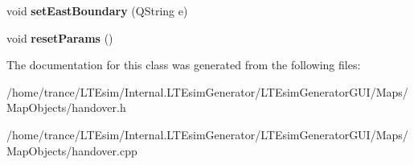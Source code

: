 \begin{DoxyCompactItemize}
\item 
void {\bfseries set\+East\+Boundary} (Q\+String e)\hypertarget{class_handover_a51f980ff22aaf1ba1ec61e8a47f12bf9}{}\label{class_handover_a51f980ff22aaf1ba1ec61e8a47f12bf9}

\item 
void {\bfseries reset\+Params} ()\hypertarget{class_handover_a4fa83bf8e6dfc62c847505f776cc044b}{}\label{class_handover_a4fa83bf8e6dfc62c847505f776cc044b}

\end{DoxyCompactItemize}


The documentation for this class was generated from the following files\+:\begin{DoxyCompactItemize}
\item 
/home/trance/\+L\+T\+Esim/\+Internal.\+L\+T\+Esim\+Generator/\+L\+T\+Esim\+Generator\+G\+U\+I/\+Maps/\+Map\+Objects/handover.\+h\item 
/home/trance/\+L\+T\+Esim/\+Internal.\+L\+T\+Esim\+Generator/\+L\+T\+Esim\+Generator\+G\+U\+I/\+Maps/\+Map\+Objects/handover.\+cpp\end{DoxyCompactItemize}
